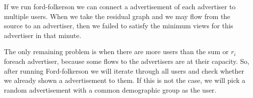 \documentclass{article}
\begin{document}
If we run ford-folkerson we can connect a advertisement of each advertiser to multiple users. When we take the residual graph and we may flow from the source to an advertiser, then we failed to satisfy the minimum views for this advertiser in that minute.

The only remaining problem is when there are more users than the sum or $r_i$ foreach advertiser, because some flows to the advertisers are at their capacity. So, after running Ford-folkerson we will iterate through all users and check whether we already shown a advertisement to them. If this is not the case, we will pick a random advertisement with a common demographic group as the user.

%

%
%
%
\end{document}
